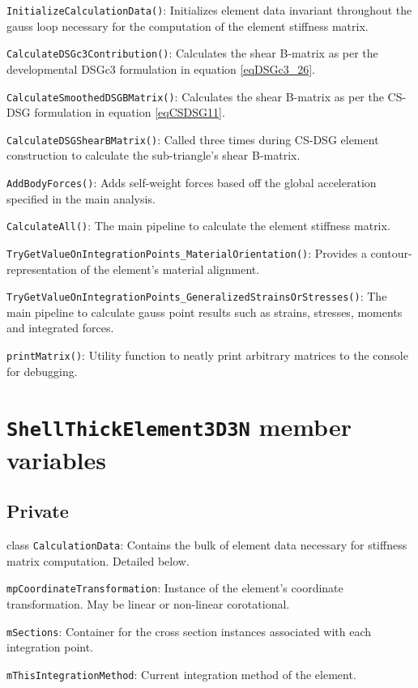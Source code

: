 \texttt{InitializeCalculationData()}: Initializes element data invariant throughout the gauss loop necessary for the computation of the element stiffness matrix.

\texttt{CalculateDSGc3Contribution()}: Calculates the shear B-matrix as per the developmental DSGc3 formulation in equation \ref{eqDSGc3_26}.

\texttt{CalculateSmoothedDSGBMatrix()}: Calculates the shear B-matrix as per the CS-DSG formulation in equation \ref{eqCSDSG11}.

\texttt{CalculateDSGShearBMatrix()}: Called three times during CS-DSG element construction to calculate the sub-triangle's shear B-matrix.

\texttt{AddBodyForces()}: Adds self-weight forces based off the global acceleration specified in the main analysis.

\texttt{CalculateAll()}: The main pipeline to calculate the element stiffness matrix.

\texttt{TryGetValueOnIntegrationPoints\_MaterialOrientation()}: Provides a contour-representation of the element's material alignment.

\texttt{TryGetValueOnIntegrationPoints\_GeneralizedStrainsOrStresses()}: The main pipeline to calculate gauss point results such as strains, stresses, moments and integrated forces.

\texttt{printMatrix()}: Utility function to neatly print arbitrary matrices to the console for debugging.

\section{\texttt{ShellThickElement3D3N} member variables}
\subsection{Private}

class \texttt{CalculationData}: Contains the bulk of element data necessary for stiffness matrix computation. Detailed below.

\texttt{mpCoordinateTransformation}: Instance of the element's coordinate transformation. May be linear or non-linear corotational.

\texttt{mSections}: Container for the cross section instances associated with each integration point.

\texttt{mThisIntegrationMethod}: Current integration method of the element.

